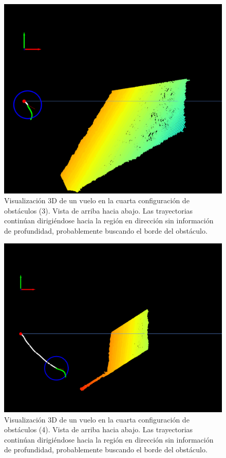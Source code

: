 \begin{figure}[H]
    \centering
    \includegraphics[scale=0.25]{partes/img/depth-wall-3-try-arround.png}
    \caption[Visualización 3D de un vuelo en la cuarta configuración de obstáculos (3). Vista de arriba hacia abajo. Búsqueda del borde del obstáculo.]{Visualización 3D de un vuelo en la cuarta configuración de obstáculos (3). Vista de arriba hacia abajo. Las trayectorias continúan dirigiéndose hacia la región en dirección  sin información de profundidad, probablemente buscando el borde del obstáculo.}
    \label{depth-wall-3}
\end{figure}

\begin{figure}[H]
    \centering
    \includegraphics[scale=0.25]{partes/img/depth-wall-4-still-go-arround.png}
    \caption[Visualización 3D de un vuelo en la cuarta configuración de obstáculos (4). Vista de arriba hacia abajo. Búsqueda del borde del obstáculo.]{Visualización 3D de un vuelo en la cuarta configuración de obstáculos (4). Vista de arriba hacia abajo. Las trayectorias continúan dirigiéndose hacia la región en dirección  sin información de profundidad, probablemente buscando el borde del obstáculo.}
    \label{depth-wall-4}
\end{figure}


